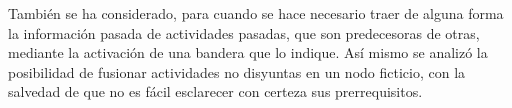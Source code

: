 También se ha considerado, para cuando se hace necesario traer de alguna forma la información pasada de actividades pasadas, que son predecesoras de otras, mediante la activación de una bandera que lo indique. Así mismo se analizó la posibilidad de fusionar actividades no disyuntas en un nodo ficticio, con la salvedad de que no es fácil esclarecer con certeza sus prerrequisitos.

